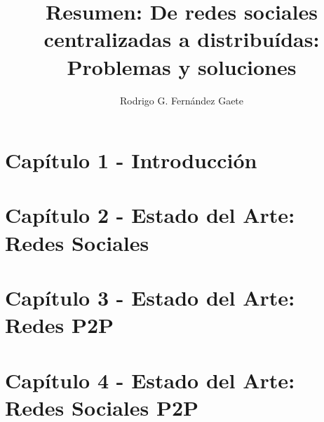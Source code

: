 \documentclass[letter, 12pt]{report}
\title{Resumen: De redes sociales centralizadas a distribuídas: Problemas y soluciones}
\author{Rodrigo G. Fernández Gaete}
\begin{document}
\draft
\nofront 

\beforepreface




%
%
%
%
%


\renewcommand{\chaptername}{Capítulo}
\section*{Capítulo 1 - Introducción}
\label{sec:intro}

\section*{Capítulo 2 - Estado del Arte: Redes Sociales}
\label{sec:soa_redes_sociales}

\section*{Capítulo 3 - Estado del Arte: Redes P2P}
\label{sec:soa_p2p}

\section*{Capítulo 4 - Estado del Arte: Redes Sociales P2P}
\label{sec:soa_p2pson}

%
\end{document}
